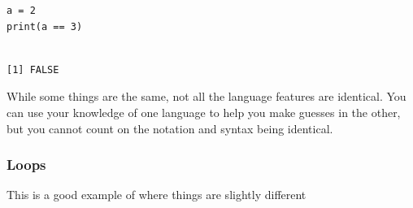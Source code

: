 \documentclass{article}
\begin{document}
\begin{verbatim}
a = 2
print(a == 3)
\end{verbatim}

\begin{verbatim}

[1] FALSE
\end{verbatim}

While some things are the same, not all the language features are identical. You can use your knowledge of one language to help you make guesses in the other, but you cannot count on the notation and syntax being identical.
\subsubsection{Loops}
\label{sec:org0cfff11}
This is a good example of where things are slightly different
\end{document}
